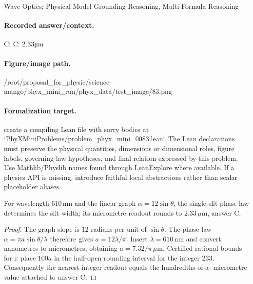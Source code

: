 Wave Optics; Physical Model Grounding Reasoning, Multi-Formula Reasoning

\paragraph{Recorded answer/context.}
C: C: 2.33μm

\paragraph{Figure/image path.}
/root/proposal\_for\_physic/science-mango/phyx\_mini\_run/phyx\_data/test\_image/83.png

\paragraph{Formalization target.}
create a compiling Lean file with sorry bodies at `PhyXMiniProblems/problem\_phyx\_mini\_0083.lean`. The Lean declarations must preserve the physical quantities, dimensions or dimensional roles, figure labels, governing-law hypotheses, and final relation expressed by this problem.
Use Mathlib/Physlib names found through LeanExplore where available. If a physics API is missing, introduce faithful local abstractions rather than scalar placeholder aliases.

\begin{theorem}
\label{thm:physics:phyx_mini_0083:target}
For wavelength \(610\,\mathrm{nm}\) and the linear graph
\(\alpha=12\sin\theta\), the single-slit phase law determines the slit width;
its micrometre readout rounds to \(2.33\,\mu\mathrm m\), answer C.
\end{theorem}
\begin{proof}
The graph slope is \(12\) radians per unit of \(\sin\theta\).  The phase law
\(\alpha=\pi a\sin\theta/\lambda\) therefore gives
\(a=12\lambda/\pi\).  Insert \(\lambda=610\,\mathrm{nm}\) and convert
nanometres to micrometres, obtaining \(a=7.32/\pi\,\mu\mathrm m\).
Certified rational bounds for \(\pi\) place
\(100a\) in the half-open rounding interval for the integer \(233\).
Consequently the nearest-integer readout equals the hundredths-of-a-
micrometre value attached to answer C.
\end{proof}


